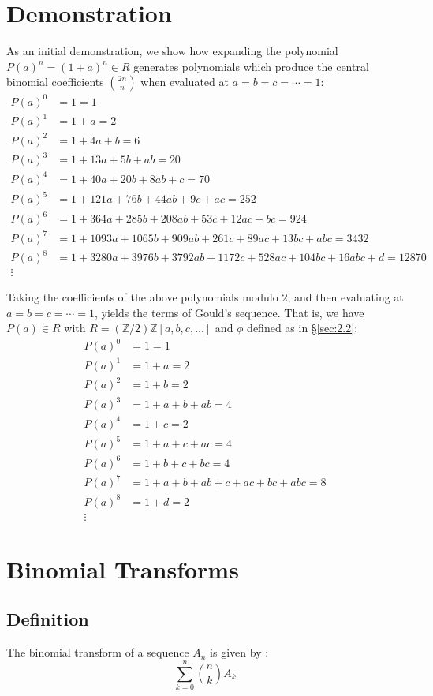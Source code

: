 \documentclass{article}
\theoremstyle{plain}
\theoremstyle{definition}
\begin{document}
\section{Demonstration}
As an initial demonstration, we show how expanding the polynomial \(P(a)^n = (1+a)^n \in R\) generates polynomials which produce the central binomial coefficients \( \binom{2n}{n} \) when evaluated at \( a=b=c=\cdots=1 \):
\begin{align*}
    P(a)^0 &= 1 = 1 \\
    P(a)^1 &= 1+a = 2 \\
    P(a)^2 &= 1+4a+b = 6 \\
    P(a)^3 &= 1+13a+5b+ab = 20 \\
    P(a)^4 &= 1+40a+20b+8ab+c = 70 \\
    P(a)^5 &= 1+121a+76b+44ab+9c+ac = 252 \\
    P(a)^6 &= 1+364a+285b+208ab+53c+12ac+bc = 924 \\
    P(a)^7 &= 1+1093a+1065b+909ab+261c+89ac+13bc+abc = 3432 \\
    P(a)^8 &= 1+3280a+3976b+3792ab+1172c+528ac+104bc+16abc+d = 12870 \\
    \vdots
\end{align*}

Taking the coefficients of the above polynomials modulo \(2\), and then evaluating at \( a=b=c=\cdots=1 \), yields the terms of Gould's sequence. That is, we have \( P(a) \in R \) with \(R = (\mathbb{Z}/2)\mathbb{Z}[a, b, c, \ldots]\) and \(\phi\) defined as in \S \ref{sec:2.2}:
\begin{align*}
    P(a)^0 &= 1 = 1 \\
    P(a)^1 &= 1+a = 2 \\
    P(a)^2 &= 1+b = 2 \\
    P(a)^3 &= 1+a+b+ab = 4 \\
    P(a)^4 &= 1+c = 2 \\
    P(a)^5 &= 1+a+c+ac = 4 \\
    P(a)^6 &= 1+b+c+bc = 4 \\
    P(a)^7 &= 1+a+b+ab+c+ac+bc+abc = 8 \\
    P(a)^8 &= 1+d = 2 \\
    \vdots
\end{align*}

\section{Binomial Transforms}
\subsection{Definition}
The binomial transform of a sequence \( A_n \) is given by \cite{Graham1994}:
\[
    \sum_{k=0}^{n} \binom{n}{k} A_k
\]
\end{document}
